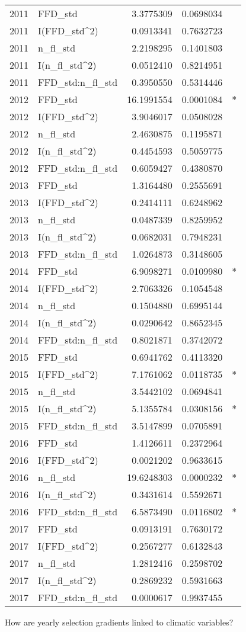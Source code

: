 \documentclass[]{article}
\begin{document}
\begin{longtable}[]{@{}llrrl@{}}
2011 & FFD\_std & 3.3775309 & 0.0698034 &\tabularnewline
2011 & I(FFD\_std\^{}2) & 0.0913341 & 0.7632723 &\tabularnewline
2011 & n\_fl\_std & 2.2198295 & 0.1401803 &\tabularnewline
2011 & I(n\_fl\_std\^{}2) & 0.0512410 & 0.8214951 &\tabularnewline
2011 & FFD\_std:n\_fl\_std & 0.3950550 & 0.5314446 &\tabularnewline
2012 & FFD\_std & 16.1991554 & 0.0001084 & *\tabularnewline
2012 & I(FFD\_std\^{}2) & 3.9046017 & 0.0508028 &\tabularnewline
2012 & n\_fl\_std & 2.4630875 & 0.1195871 &\tabularnewline
2012 & I(n\_fl\_std\^{}2) & 0.4454593 & 0.5059775 &\tabularnewline
2012 & FFD\_std:n\_fl\_std & 0.6059427 & 0.4380870 &\tabularnewline
2013 & FFD\_std & 1.3164480 & 0.2555691 &\tabularnewline
2013 & I(FFD\_std\^{}2) & 0.2414111 & 0.6248962 &\tabularnewline
2013 & n\_fl\_std & 0.0487339 & 0.8259952 &\tabularnewline
2013 & I(n\_fl\_std\^{}2) & 0.0682031 & 0.7948231 &\tabularnewline
2013 & FFD\_std:n\_fl\_std & 1.0264873 & 0.3148605 &\tabularnewline
2014 & FFD\_std & 6.9098271 & 0.0109980 & *\tabularnewline
2014 & I(FFD\_std\^{}2) & 2.7063326 & 0.1054548 &\tabularnewline
2014 & n\_fl\_std & 0.1504880 & 0.6995144 &\tabularnewline
2014 & I(n\_fl\_std\^{}2) & 0.0290642 & 0.8652345 &\tabularnewline
2014 & FFD\_std:n\_fl\_std & 0.8021871 & 0.3742072 &\tabularnewline
2015 & FFD\_std & 0.6941762 & 0.4113320 &\tabularnewline
2015 & I(FFD\_std\^{}2) & 7.1761062 & 0.0118735 & *\tabularnewline
2015 & n\_fl\_std & 3.5442102 & 0.0694841 &\tabularnewline
2015 & I(n\_fl\_std\^{}2) & 5.1355784 & 0.0308156 & *\tabularnewline
2015 & FFD\_std:n\_fl\_std & 3.5147899 & 0.0705891 &\tabularnewline
2016 & FFD\_std & 1.4126611 & 0.2372964 &\tabularnewline
2016 & I(FFD\_std\^{}2) & 0.0021202 & 0.9633615 &\tabularnewline
2016 & n\_fl\_std & 19.6248303 & 0.0000232 & *\tabularnewline
2016 & I(n\_fl\_std\^{}2) & 0.3431614 & 0.5592671 &\tabularnewline
2016 & FFD\_std:n\_fl\_std & 6.5873490 & 0.0116802 & *\tabularnewline
2017 & FFD\_std & 0.0913191 & 0.7630172 &\tabularnewline
2017 & I(FFD\_std\^{}2) & 0.2567277 & 0.6132843 &\tabularnewline
2017 & n\_fl\_std & 1.2812416 & 0.2598702 &\tabularnewline
2017 & I(n\_fl\_std\^{}2) & 0.2869232 & 0.5931663 &\tabularnewline
2017 & FFD\_std:n\_fl\_std & 0.0000617 & 0.9937455 &\tabularnewline
\bottomrule
\end{longtable}

How are yearly selection gradients linked to climatic variables?
\end{document}
